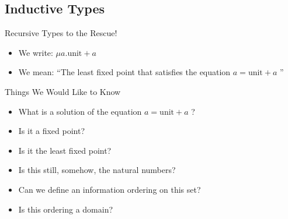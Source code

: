 \documentclass{beamer}
\begin{document}
\subsection{Inductive Types}

\begin{frame}{Recursive Types to the Rescue!}

  \begin{itemize}
    \item We write: $\mu a . \text{unit} + a$
    \item We mean: ``The least fixed point that satisfies the equation $a = \text{unit} + a$ ''
  \end{itemize}

  \begin{center}
  \end{center}

\end{frame}


\begin{frame}{Things We Would Like to Know}

  \begin{itemize}
    \item What is a solution of the equation $a = \text{unit} + a$ ?
    \item Is it a fixed point?
    \item Is it the least fixed point?
    \item Is this still, somehow, the natural numbers?
    \item Can we define an information ordering on this set?
    \item Is this ordering a domain?
  \end{itemize}

\end{frame}
\end{document}
